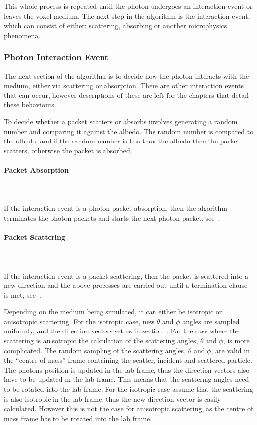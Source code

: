 This whole process is repeated until the photon undergoes an interaction event or leaves the voxel medium.
The next step in the algorithm is the interaction event, which can consist of either: scattering, absorbing or another microphysics phenomena. 

\subsubsection*{Photon Interaction Event}\label{sec:photscatterabsorb}

The next section of the algorithm is to decide how the photon interacts with the medium, either via scattering or absorption. There are other interaction events that can occur, however descriptions of these are left for the chapters that detail these behaviours.
\medskip

To decide whether a packet scatters or absorbs involves generating a random number and comparing it against the albedo. The random number is compared to the albedo, and if the random number is less than the albedo then the packet scatters, otherwise the packet is absorbed.

\paragraph{Packet Absorption}\hspace{0pt}\\
\\
If the interaction event is a photon packet absorption, then the algorithm terminates the photon packets and starts the next photon packet, see~.

\paragraph{Packet Scattering}\hspace{0pt}\\
\\
If the interaction event is a packet scattering, then the packet is scattered into a new direction and the above processes are carried out until a termination clause is met, see~.

Depending on the medium being simulated, it can either be isotropic or anisotropic scattering. 
For the isotropic case, new $\theta$ and $\phi$ angles are sampled uniformly, and the direction vectors set as in section~.
For the case where the scattering is anisotropic the calculation of the scattering angles, $\theta$ and $\phi$, is more complicated.
The random sampling of the scattering angles, $\theta$ and $\phi$, are valid in the ``centre of mass'' frame containing the scatter, incident and scattered particle.
The photons position is updated in the lab frame, thus the direction vectors also have to be updated in the lab frame.
This means that the scattering angles need to be rotated into the lab frame.
For the isotropic case assume that the scattering is also isotropic in the lab frame, thus the new direction vector is easily calculated.
However this is not the case for anisotropic scattering, as the centre of mass frame has to be rotated into the lab frame.


